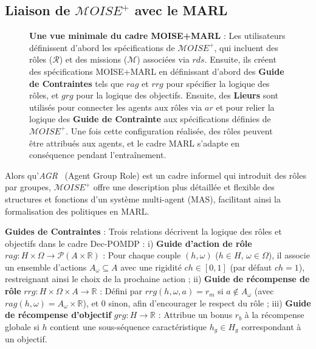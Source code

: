 \documentclass[dissemination]{jfsma}
\begin{document}
\subsection{Liaison de \(\mathcal{M}OISE^+\) avec le MARL}

\begin{figure}[h!]

    \caption{\textbf{Une vue minimale du cadre MOISE+MARL} :
    Les utilisateurs définissent d'abord les spécifications de \(\mathcal{M}OISE^+\), qui incluent des rôles (\(\mathcal{R}\)) et des missions (\(\mathcal{M}\)) associées via \(rds\). Ensuite, ils créent des spécifications MOISE+MARL en définissant d'abord des \textbf{Guide de Contraintes} tels que \(rag\) et \(rrg\) pour spécifier la logique des rôles, et \(grg\) pour la logique des objectifs.
    Ensuite, des \textbf{Lieurs} sont utilisés pour connecter les agents aux rôles via \(ar\) et pour relier la logique des \textbf{Guide de Contrainte} aux spécifications définies de \(\mathcal{M}OISE^+\). Une fois cette configuration réalisée, des rôles peuvent être attribués aux agents, et le cadre MARL s'adapte en conséquence pendant l'entraînement.
    }
    \label{fig:mm_synthesis}
\end{figure}

Alors qu'\textit{AGR}~\cite{ferber2003} (Agent Group Role) est un cadre informel qui introduit des rôles par groupes, \(\mathcal{M}OISE^+\) offre une description plus détaillée et flexible des structures et fonctions d'un système multi-agent (MAS), facilitant ainsi la formalisation des politiques en MARL.

\medskip
\noindent \textbf{Guides de Contraintes} : Trois relations décrivent la logique des rôles et objectifs dans le cadre Dec-POMDP :
i) \textbf{Guide d'action de rôle} \(rag: H \times \Omega \to \mathcal{P}(A \times \mathbb{R})\) : Pour chaque couple \((h,\omega)\) (\(h\in H\), \(\omega\in \Omega\)), il associe un ensemble d'actions \(A_\omega \subseteq A\) avec une rigidité \(ch \in [0,1]\) (par défaut \(ch=1\)), restreignant ainsi le choix de la prochaine action ; \quad
ii) \textbf{Guide de récompense de rôle} \(rrg: H \times \Omega \times A \to \mathbb{R}\) : Défini par \(rrg(h,\omega,a)=r_m\) si \(a \notin A_\omega\) (avec \(rag(h,\omega)=A_\omega \times \mathbb{R}\)), et 0 sinon, afin d'encourager le respect du rôle ; \quad
iii) \textbf{Guide de récompense d'objectif} \(grg: H \to \mathbb{R}\) : Attribue un bonus \(r_b\) à la récompense globale si \(h\) contient une sous-séquence caractéristique \(h_g \in H_g\) correspondant à un objectif.
\end{document}
